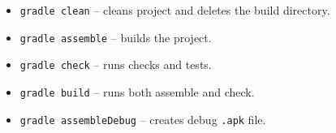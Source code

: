 \begin{itemize}
  \item \texttt{gradle clean} -- cleans project and deletes the build directory.
  \item \texttt{gradle assemble} -- builds the project.
  \item \texttt{gradle check} -- runs checks and tests.
  \item \texttt{gradle build} -- runs both assemble and check.
  \item \texttt{gradle assembleDebug} -- creates debug \texttt{.apk} file.
\end{itemize}
